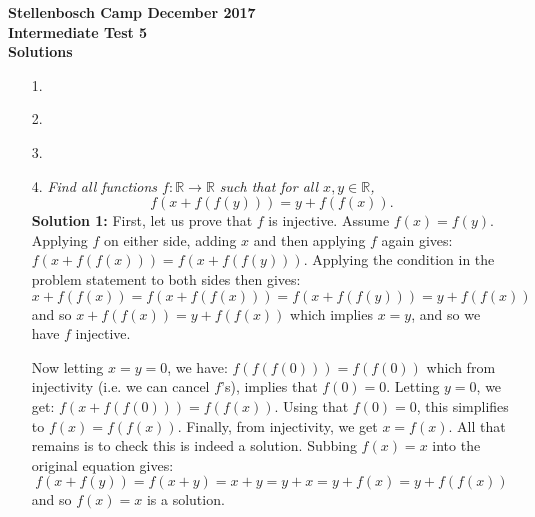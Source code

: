 \documentclass[a4paper,12pt]{article}
\begin{document}
\begin{center}
\textbf{Stellenbosch Camp December 2017 \\ Intermediate Test 5} \\
\textbf{Solutions}
\end{center}


\begin{enumerate}
  
  \item[1.] 
  
  
  \item[2.] 
  
  
  \item[3.] 


  \item[4.] \emph{Find all functions $f: \mathbb{R} \to \mathbb{R}$ such that for all $x,y \in \mathbb{R}$,
\[ f(x+f(f(y))) = y+f(f(x)). \]}
  \textbf{Solution 1:} First, let us prove that $f$ is injective. Assume $f(x)=f(y)$. Applying $f$ on either side, adding $x$ and then applying $f$ again gives: $f(x+f(f(x))) = f(x+f(f(y)))$. Applying the condition in the problem statement to both sides then gives:  
  \begin{equation*}
    x+f(f(x)) = f(x+f(f(x))) = f(x+f(f(y))) = y+f(f(x)) 
  \end{equation*} 
  and so $x+f(f(x)) = y+f(f(x))$ which implies $x=y$, and so we have $f$ injective.
  
  Now letting $x=y=0$, we have: $f(f(f(0))) = f(f(0))$ which from injectivity (i.e. we can cancel $f$'s), implies that $f(0)=0$. Letting $y=0$, we get: $f(x+f(f(0))) = f(f(x))$. Using that $f(0)=0$, this simplifies to $f(x)=f(f(x))$. Finally, from injectivity, we get $x=f(x)$. All that remains is to check this is indeed a solution. Subbing $f(x)=x$ into the original equation gives:
  \begin{equation*}
    f(x+f(y)) = f(x+y) = x+y = y+x = y+f(x) = y+f(f(x))
  \end{equation*}
  and so $f(x)=x$ is a solution.
  

\end{enumerate}
\end{document}
